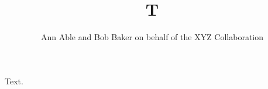 \documentclass{article}
\begin{document}
\title{T}
\author{Ann Able and Bob Baker on behalf of the XYZ Collaboration}
\maketitle
Text.
\end{document}
